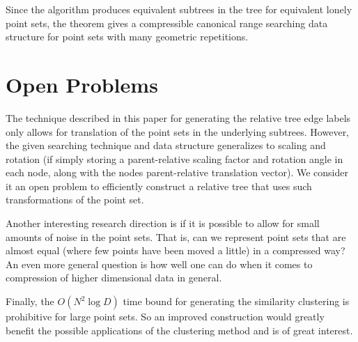 Since the algorithm produces equivalent subtrees in the tree for equivalent lonely point sets, the theorem gives a compressible canonical range searching data structure for point sets with many geometric repetitions.


\section{Open Problems}
The technique described in this paper for generating the relative tree edge labels only allows for translation of the point sets in the underlying subtrees. However, the given searching technique and data structure generalizes to scaling and rotation (if simply storing a parent-relative scaling factor and rotation angle in each node, along with the nodes parent-relative translation vector). We consider it an open problem to efficiently construct a relative tree that uses such transformations of the point set. 

Another interesting research direction is if it is possible to allow for small amounts of noise in the point sets. That is, can we represent point sets that are almost equal (where few points have been moved a little) in a compressed way? An even more general question is how well one can do when it comes to compression of higher dimensional data in general.

Finally, the $O(N^2 \log D)$ time bound for generating the similarity clustering is prohibitive for large point sets. So an improved construction would greatly benefit the possible applications of the clustering method and is of great interest.

%

%

%
